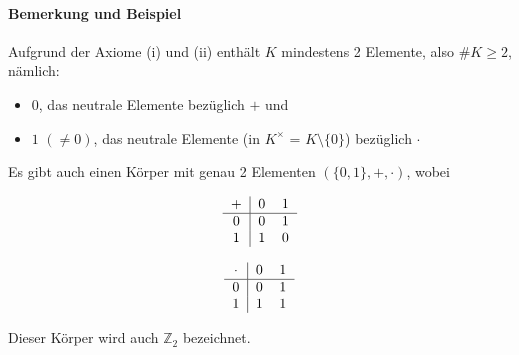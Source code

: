 \paragraph{Bemerkung und Beispiel}
	Aufgrund der Axiome (i) und (ii) enthält $ K $ mindestens 2 Elemente, also $ \# K \geq 2 $, nämlich:
	\begin{itemize}
		\item $ 0 $, das neutrale Elemente bezüglich $+$ und
		\item $1$ $(\neq 0)$, das neutrale Elemente (in $K^\times$ = $K\setminus\{0\}$) bezüglich $\cdot$
	\end{itemize}
	Es gibt auch einen Körper mit genau 2 Elementen $(\{0,1\},+,\cdot)$, wobei
	\begin{minipage}{0.45\textwidth}
		\begin{equation*}
			\begin{tabular}{c|cc}
				$+$ & 0 & 1\\\hline
				0 & 0 & 1\\
				1 & 1 & 0\\
			\end{tabular}
		\end{equation*}
	\end{minipage}
	\begin{minipage}{0.45\textwidth}
		\begin{equation*}
			\begin{tabular}{c|cc}
				$\cdot$ & 0 & 1\\\hline
				0 & 0 & 1\\
				1 & 1 & 1\\
			\end{tabular}
		\end{equation*}
	\end{minipage}
	Dieser Körper wird auch $\mathbb{Z}_2$ bezeichnet.


